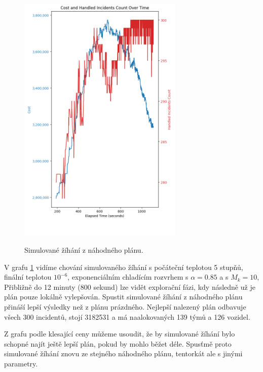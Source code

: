 \begin{figure}[H]
  \caption{Simulované žíhání z náhodného plánu.}
  \includegraphics[width=0.7\textwidth,height=0.9\textwidth]{img/plots/sa_random_85.png}
  \centering
  \label{img:sa_random}
\end{figure}

V grafu \ref{img:sa_random} vidíme chování simulovaného žíhání
s počáteční teplotou 5 stupňů, finální teplotou $10^{-6}$, exponenciálním chladícím rozvrhem s $\alpha = 0.85$ a s $M_k = 10$,
Přibližně do 12 minuty (800 sekund) lze vidět explorační fázi, kdy následně už je plán pouze lokálně vylepšován. 
Spustit simulované žíhání z náhodného plánu přináší lepší výsledky než z plánu prázdného.
Nejlepší nalezený plán odbavuje všech 300 incidentů, stojí 3182531 a má naalokovaných 139 týmů a 126 vozidel.

Z grafu podle klesající ceny můžeme usoudit, že by simulované žíhání bylo schopné najít ještě lepší plán, pokud by mohlo běžet déle.
Spusťmě proto simulované žíhání znovu ze stejného náhodného plánu, tentorkát ale s jinými parametry.


